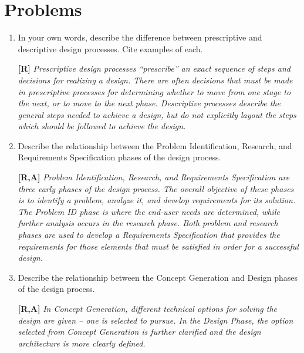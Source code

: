 \section{Problems}
\label{section:problems}

\begin{enumerate}
\itemsep0em 
\def\labelenumi{\arabic{enumi}.}
\item
  In your own words, describe the difference between prescriptive and
  descriptive design processes. Cite examples of each.
  
\begin{onlysolution}
\textbf{[R]}
\itshape
Prescriptive design processes “prescribe” an exact sequence of steps and decisions for
realizing a design. There are often decisions that must be made in prescriptive processes for
determining whether to move from one stage to the next, or to move to the next phase.
Descriptive processes describe the general steps needed to achieve a design, but do not
explicitly layout the steps which should be followed to achieve the design.
\end{onlysolution}


  
\item
Describe the relationship between the Problem Identification,
Research, and Requirements Specification phases of the design process.

\begin{onlysolution}
\textbf{[R,A]}
\itshape
Problem Identification, Research, and Requirements Specification are three early phases of
the design process. The overall objective of these phases is to identify a problem, analyze it,
and develop requirements for its solution. The Problem ID phase is where the end-user needs
are determined, while further analysis occurs in the research phase. Both problem and
research phases are used to develop a Requirements Specification that provides the
requirements for those elements that must be satisfied in order for a successful design.
\end{onlysolution}

\item
  Describe the relationship between the Concept Generation and Design
  phases of the design process.
  
\begin{onlysolution}
\textbf{[R,A]}
\itshape
  In Concept Generation, different technical options for solving the design are given – one is
selected to pursue. In the Design Phase, the option selected from Concept Generation is
further clarified and the design architecture is more clearly defined.
\end{onlysolution}
  

\end{enumerate}
